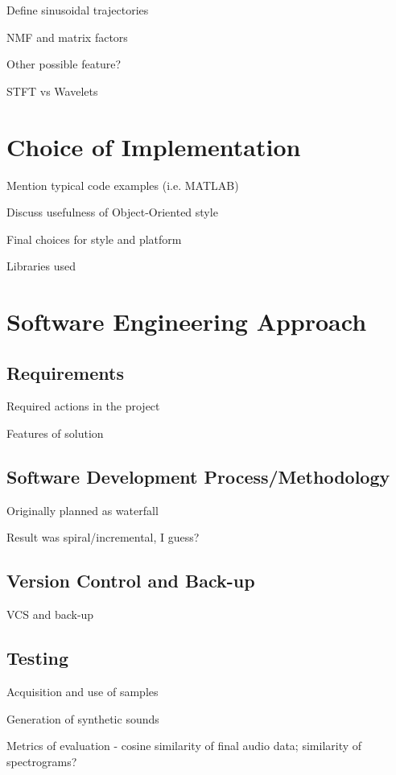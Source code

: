 \documentclass[10pt,twoside,a4paper]{report}
\begin{document}
Define sinusoidal trajectories

NMF and matrix factors

Other possible feature?

STFT vs Wavelets

\section{Choice of Implementation}

Mention typical code examples (i.e. MATLAB)

Discuss usefulness of Object-Oriented style

Final choices for style and platform

Libraries used

\section{Software Engineering Approach}

\subsection{Requirements}

Required actions in the project

Features of solution

\subsection{Software Development Process/Methodology}

Originally planned as waterfall

Result was spiral/incremental, I guess?

\subsection{Version Control and Back-up}

VCS and back-up

\subsection{Testing}

Acquisition and use of samples

Generation of synthetic sounds

Metrics of evaluation - cosine similarity of final audio data; similarity of spectrograms?
\end{document}
